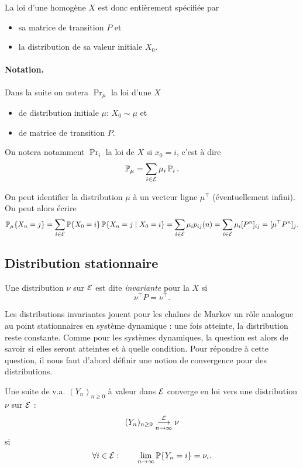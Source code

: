 \remark
La loi d'une \cM homogène $X$ est donc entièrement spécifiée par
\begin{itemize}
  \item sa matrice de transition $P$ et
  \item la distribution de sa valeur initiale $X_0$.
\end{itemize}

\paragraph*{Notation.}
Dans la suite on notera $\Pr_\mu$ la loi d'une \cM $X$
\begin{itemize}
  \item de distribution initiale $\mu$: $X_0 \sim \mu$ et
  \item de matrice de transition $P$.
\end{itemize}
On notera notamment $\Pr_i$ la loi de $X$ si $x_0 = i$, c'est à dire
$$
\operatorname{\mathbb{P}}_\mu = \sum_{i \in \mathcal{E}} \mu_i \operatorname{\mathbb{P}}_i.
$$

\remark
On peut identifier la distribution $\mu$ à un vecteur ligne $\mu^\top$ (éventuellement infini). On peut alors écrire
$$
\operatorname{\mathbb{P}}_\mu\{X_n = j\} 
= \sum_{i \in \mathcal{E}} \operatorname{\mathbb{P}}\{X_0 = i\} \operatorname{\mathbb{P}}\{X_n = j \mid X_0 = i\}
= \sum_{i \in \mathcal{E}} \mu_i p_{ij}(n)
= \sum_{i \in \mathcal{E}} \mu_i [P^n]_{ij}
= [\mu^\top P^n]_j.
$$

\subsection{Distribution stationnaire}  

\begin{definition}
  Une distribution $\nu$ sur $\mathcal{E}$ est dite \emph{invariante} pour la \cM $X$ si 
  $$
  \nu^\top P = \nu^\top.
  $$
\end{definition}

Les distributions invariantes jouent pour les chaînes de Markov un rôle analogue au point stationnaires en système dynamique : une fois atteinte, la distribution reste constante. Comme pour les systèmes dynamiques, la question est alors de savoir si elles seront atteintes et à quelle condition. Pour répondre à cette question, il nous faut d'abord définir une notion de convergence pour des distributions.

\begin{definition}
  Une suite de v.a. $(Y_n)_{n \geq 0}$ à valeur dans $\mathcal{E}$ converge en loi vers une distribution $\nu$ sur $\mathcal{E}$ :
  $$
  (Y_n)_{n \geq 0} \overset{\mathcal{L}}{\underset{n \to \infty}{\longrightarrow}} \nu
  $$
  si
  $$
  \forall i \in \mathcal{E}: \qquad \lim_{n \to \infty} \operatorname{\mathbb{P}}\{Y_n = i\} = \nu_i.
  $$
\end{definition}

